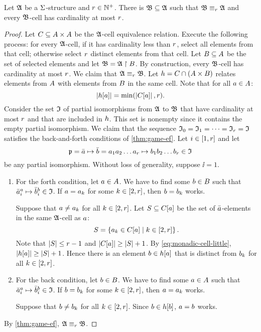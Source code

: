 \begin{lemma}\label{lem:monadic-cell}
Let $\mathfrak{A}$ be a $\mathrm{\Sigma}$-structure and $r \in \mathbb{N}^{+}$.
There is $\mathfrak{B} \subseteq \mathfrak{A}$ such that
$\mathfrak{B} \equiv_{r} \mathfrak{A}$ and every $\mathfrak{B}$-cell has cardinality at most $r$.
\end{lemma}
\begin{proof}
Let $C \subseteq {A\times A}$ be the $\mathfrak{A}$-cell equivalence relation.
Execute the following process: for every $\mathfrak{A}$-cell, if it has cardinality
less than $r$, select all elements from that cell;
otherwise select $r$ distinct elements from that cell.
Let $B \subseteq A$ be the set of selected elements and let
$\mathfrak{B} = \mathfrak{A} \restriction B$.
By construction, every $\mathfrak{B}$-cell has cardinality at most $r$.
We claim that $\mathfrak{A} \equiv_{r} \mathfrak{B}$.
Let $h = C \cap (A \times B)$ relates elements from $A$ with
elements from $B$ in the same cell.
Note that for all $a \in A$:
\begin{equation}\label{eq:monadic-cell-little}
  \left|h[a]\right| = \min(\left|C[a]\right|, r).
\end{equation}
Consider the set $\mathfrak{I}$ of partial isomorphisms from $\mathfrak{A}$ to $\mathfrak{B}$ that
have cardinality at most $r$ and that are included in $h$.
This set is nonempty since it contains the empty partial isomorphism.
We claim that the sequence $\mathfrak{I}_{0} = \mathfrak{I}_{1} = \dots = \mathfrak{I}_{r} = \mathfrak{I}$
satisfies the back-and-forth conditions of \cref{thm:game-ef}.
Let $i \in [1,r]$ and let 
\[
  \mathfrak{p} = \bar{a} \mapsto \bar{b} =
  a_{1}a_{2}\dots a_{r} \mapsto b_{1}b_{2}\dots b_{r} \in \mathfrak{I}
\]
be any partial isomorphism.
Without loss of generality, suppose $\ii = 1$.
\begin{enumerate}
  \item For the forth condition, let $a \in A$.
  We have to find some $b \in B$ such that
  $\bar{a}_{i}^{a} \mapsto \bar{b}_{i}^{b} \in \mathfrak{I}$.
  If $a = a_{k}$ for some $k \in [2,r]$, then $b = b_{k}$ works.
  
  Suppose that $a \neq a_{k}$ for all $k \in [2,r]$.
  Let $S \subseteq C[a]$ be the set of $\bar{a}$-elements in the same
  $\mathfrak{A}$-cell as $a$:
  \[
    S = \left\{a_{k} \in C[a]\mathrel{}\middle|\mathrel{}k \in [2,r]\right\}.
  \]
  Note that $\left|S\right| \leq r-1$ and
  $\left|C[a]\right| \geq \left|S\right| + 1$.
  By \cref{eq:monadic-cell-little}, $\left|h[a]\right| \geq \left|S\right| + 1$.
  Hence there is an element $b \in h[a]$ that is distinct from
  $b_{k}$ for all $k \in [2,r]$.
  \item For the back condition, let $b \in B$.
  We have to find some $a \in A$ such that
  $\bar{a}_{i}^{a} \mapsto \bar{b}_{i}^{b} \in \mathfrak{I}$.
  If $b = b_{k}$ for some $k \in [2,r]$, then $a = a_{k}$ works.
  
  Suppose that $b \neq b_{k}$ for all $k \in [2,r]$. Since $b \in
  h[b]$, $a = b$ works.
\end{enumerate}
By \cref{thm:game-ef}, $\mathfrak{A} \equiv_{r} \mathfrak{B}$.
\end{proof}